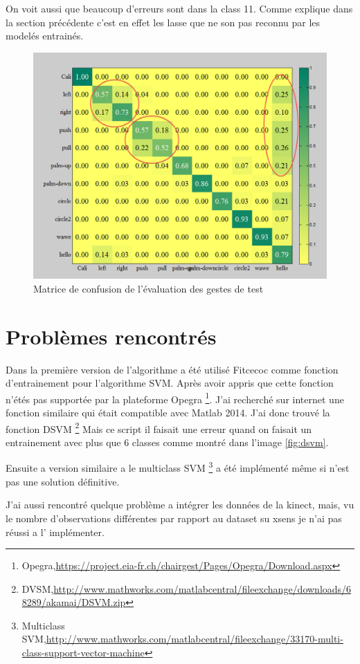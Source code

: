 On voit aussi que beaucoup d'erreurs sont dans la class 11. Comme explique dans la section précédente c'est en effet les  lasse que ne son pas reconnu par les modelés entrainés.



\begin{figure}[h]
  \centering
    \includegraphics[width=0.7\linewidth]{img/evaluation/evalerror.png}
  \caption{Matrice de confusion de l'évaluation des gestes de test}
  \label{fig:conferror}
\end{figure}

\section*{Problèmes rencontrés}
Dans la première version de l'algorithme a été utilisé Fitcecoc comme fonction d'entrainement pour l'algorithme SVM. Après avoir appris que cette fonction n'étés pas supportée par la plateforme Opegra \footnote{Opegra,\url{https://project.eia-fr.ch/chairgest/Pages/Opegra/Download.aspx}}. J’ai recherché sur internet une fonction similaire qui était compatible avec Matlab 2014. J'ai donc trouvé la fonction DSVM   \footnote{DVSM,\url{http://www.mathworks.com/matlabcentral/fileexchange/downloads/68289/akamai/DSVM.zip}} Mais ce script il faisait une erreur quand on faisait un entrainement avec plus que 6 classes comme montré dans l'image \ref{fig:dsvm}. 

Ensuite a version similaire a le multiclass SVM \footnote{Multiclass SVM,\url{http://www.mathworks.com/matlabcentral/fileexchange/33170-multi-class-support-vector-machine}} a été implémenté même si n'est pas une solution définitive.


J'ai aussi rencontré quelque problème a intégrer les données de la kinect, mais,  vu le nombre d'observations différentes par rapport au dataset su xsens je n'ai pas réussi a l’ implémenter.



